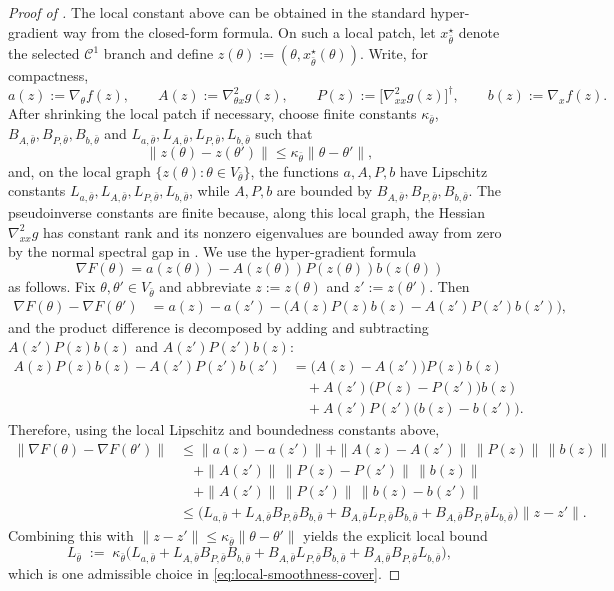 \documentclass{article}
\theoremstyle{normaltheorem}
\begin{document}
\begin{proof}[Proof of ]
The local constant above can be obtained in the standard hyper-gradient way from the closed-form formula.
On such a local patch, let $x^\star_{\bar\theta}$ denote the selected $\mathcal{C}^{1}$ branch and define
$z(\theta):=(\theta,x^\star_{\bar\theta}(\theta))$. Write, for compactness,
\[
a(z):=\nabla_\theta f(z),\qquad
A(z):=\nabla^2_{\theta x}g(z),\qquad
P(z):=\big[\nabla^2_{xx}g(z)\big]^\dagger,\qquad
b(z):=\nabla_x f(z).
\]
After shrinking the local patch if necessary, choose finite constants $\kappa_{\bar\theta}$,
$B_{A,\bar\theta},B_{P,\bar\theta},B_{b,\bar\theta}$ and
$L_{a,\bar\theta},L_{A,\bar\theta},L_{P,\bar\theta},L_{b,\bar\theta}$ such that
\[
\|z(\theta)-z(\theta')\|
\le
\kappa_{\bar\theta}\|\theta-\theta'\|,
\]
and, on the local graph $\{z(\theta):\theta\in V_{\bar\theta}\}$, the functions
$a,A,P,b$ have Lipschitz constants $L_{a,\bar\theta},L_{A,\bar\theta},L_{P,\bar\theta},L_{b,\bar\theta}$,
while $A,P,b$ are bounded by $B_{A,\bar\theta},B_{P,\bar\theta},B_{b,\bar\theta}$.
The pseudoinverse constants are finite because, along this local graph, the Hessian
$\nabla^2_{xx}g$ has constant rank and its nonzero eigenvalues are bounded away from zero by the normal spectral gap in
. We use the hyper-gradient formula
\[
\nabla F(\theta)=a(z(\theta))-A(z(\theta))P(z(\theta))b(z(\theta))
\]
as follows. Fix $\theta,\theta'\in V_{\bar\theta}$ and abbreviate
$z:=z(\theta)$ and $z':=z(\theta')$. Then
\begin{align*}
\nabla F(\theta)-\nabla F(\theta')
&=
a(z)-a(z')
-\big(A(z)P(z)b(z)-A(z')P(z')b(z')\big),
\end{align*}
and the product difference is decomposed by adding and subtracting
$A(z')P(z)b(z)$ and $A(z')P(z')b(z)$:
\begin{align*}
A(z)P(z)b(z)-A(z')P(z')b(z')
&=
\big(A(z)-A(z')\big)P(z)b(z)\\
&\quad
+A(z')\big(P(z)-P(z')\big)b(z)\\
&\quad
+A(z')P(z')\big(b(z)-b(z')\big).
\end{align*}
Therefore, using the local Lipschitz and boundedness constants above,
\begin{align*}
\|\nabla F(\theta)-\nabla F(\theta')\|
&\le
\|a(z)-a(z')\|
+\|A(z)-A(z')\|\,\|P(z)\|\,\|b(z)\|\\
&\quad
+\|A(z')\|\,\|P(z)-P(z')\|\,\|b(z)\|\\
&\quad
+\|A(z')\|\,\|P(z')\|\,\|b(z)-b(z')\|\\
&\le
\Big(
L_{a,\bar\theta}
+L_{A,\bar\theta}B_{P,\bar\theta}B_{b,\bar\theta}
+B_{A,\bar\theta}L_{P,\bar\theta}B_{b,\bar\theta}
+B_{A,\bar\theta}B_{P,\bar\theta}L_{b,\bar\theta}
\Big)\|z-z'\|.
\end{align*}
Combining this with $\|z-z'\|\le\kappa_{\bar\theta}\|\theta-\theta'\|$ yields the explicit local bound
\begin{equation}\label{eq:local-LF-closed-form}
L_{\bar\theta}
\;:=\;
\kappa_{\bar\theta}
\Big(
L_{a,\bar\theta}
+L_{A,\bar\theta}B_{P,\bar\theta}B_{b,\bar\theta}
+B_{A,\bar\theta}L_{P,\bar\theta}B_{b,\bar\theta}
+B_{A,\bar\theta}B_{P,\bar\theta}L_{b,\bar\theta}
\Big),
\end{equation}
which is one admissible choice in \eqref{eq:local-smoothness-cover}.


\end{proof}
\end{document}
